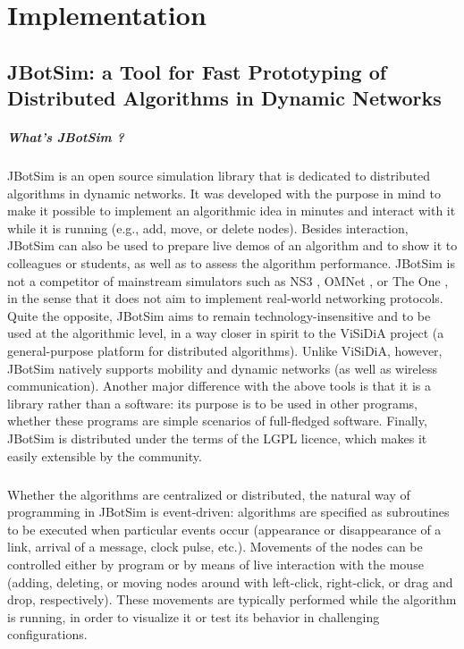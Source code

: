 \chapter{Implementation}
\section{JBotSim: a Tool for Fast Prototyping of Distributed Algorithms in Dynamic Networks}
\paragraph{What's JBotSim ?}JBotSim is an open source simulation library that is dedicated to distributed algorithms in dynamic networks. It was developed with the purpose in mind to make it possible to implement an algorithmic idea in minutes and interact with it while it is running (e.g., add, move, or delete nodes). Besides interaction, JBotSim can also be used to prepare live demos of an algorithm and to show it to colleagues or students, as well as to assess the algorithm performance. JBotSim is not a competitor of mainstream simulators such as NS3 \cite{35}, OMNet \cite{40}, or The One \cite{38}, in the sense that it does not aim to implement real-world networking protocols. Quite the opposite, JBotSim aims to remain technology-insensitive and to be used at the algorithmic level, in a way closer in spirit to the ViSiDiA project (a general-purpose platform for distributed algorithms). Unlike ViSiDiA, however, JBotSim natively supports mobility and dynamic networks (as well as wireless communication). Another major difference with the above tools is that it is a library rather than a software: its purpose is to be used in other programs, whether these programs are simple scenarios of full-fledged software. Finally, JBotSim is distributed under the terms of the LGPL licence, which makes it easily extensible by the community.
\paragraph{}Whether the algorithms are centralized or distributed, the natural way of programming in JBotSim is event-driven: algorithms are specified as subroutines to be executed when particular events occur (appearance or disappearance of a link, arrival of a message, clock pulse, etc.). Movements of the nodes can be controlled either by program or by means of live interaction with the mouse (adding, deleting, or moving nodes around with left-click, right-click, or drag and drop, respectively). These movements are typically performed while the algorithm is running, in order to visualize it or test its behavior in challenging configurations.
